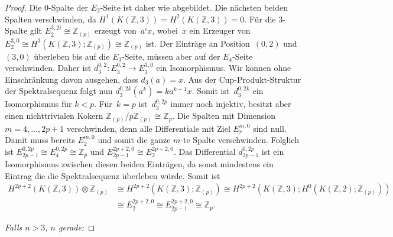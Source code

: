 \documentclass[11pt, a4paper, german]{article}
\theoremstyle{definition}
\theoremstyle{remark}
\newcommand{\Z}{\mathbb{Z}} %
\begin{document}
\begin{proof}
  Die $0$-Spalte der $E_2$-Seite ist daher wie abgebildet.
  Die nächsten beiden Spalten verschwinden, da $H^1(K(\Z, 3)) = H^2(K(\Z, 3)) = 0$. Für die $3$-Spalte gilt $E_2^{3,2i} \cong \Z_{(p)}$ erzeugt von~$a^i x$, wobei~$x$ ein Erzeuger von $E_2^{3,0} \cong H^3(K(\Z, 3); \Z_{(p)}) \cong \Z_{(p)}$ ist.
  Der Einträge an Position~$(0, 2)$ und~$(3, 0)$ überleben bis auf die $E_3$-Seite, müssen aber auf der $E_4$-Seite verschwinden.
  Daher ist $d_3^{0,2} : E_3^{0,2} \to E_3^{3,0}$ ein Isomorphismus.
  Wir können ohne Einschränkung davon ausgehen, dass $d_3(a) = x$.
  Aus der Cup-Produkt-Struktur der Spektralsequenz folgt nun $d_3^{0,2k}(a^k) = k a^{k-1} x$.
  Somit ist~$d_3^{0,2k}$ ein Isomorphismus für $k < p$.
  Für~$k = p$ ist~$d_3^{0,2p}$ immer noch injektiv, besitzt aber einen nichttrivialen Kokern $\Z_{(p)} / p \Z_{(p)} \cong \Z_p$.
  Die Spalten mit Dimension $m = 4, \ldots, 2p+1$ verschwinden, denn alle Differentiale mit Ziel $E_r^{m,0}$ sind null.
  Damit muss bereits $E_2^{m,0}$ und somit die ganze $m$-te Spalte verschwinden.
  Folglich ist $E_{2p-1}^{0,2p} \cong E_4^{0,2p} \cong \Z_p$ und $E_{2p-1}^{2p+2,0} \cong E_2^{2p+2,0}$.
  Das Differential $d_{2p-1}^{0,2p}$ ist ein Isomorphismus zwischen diesen beiden Einträgen, da sonst mindestens ein Eintrag die die Spektralsequenz überleben würde.
  Somit ist
  \begin{align*}
    H^{2p+2}(K(\Z, 3)) \otimes \Z_{(p)} & \cong H^{2p+2}(K(\Z, 3); \Z_{(p)}) \cong H^{2p+2}(K(\Z, 3); H^0(K(\Z, 2); \Z_{(p)})) \\
    & \cong E_2^{2p+2,0} \cong E_{2p-1}^{2p+2,0} \cong \Z_p.
  \end{align*}
  
  \emph{Falls $n > 3$, $n$ gerade:} \enspace
  

\end{proof}
\end{document}

